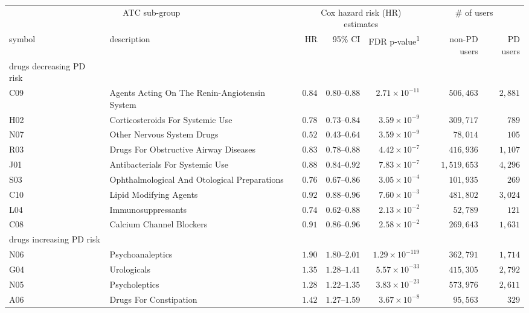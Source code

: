 \captionsetup[table]{labelformat=empty,skip=1pt}
\begin{longtable}{llrrrrr}
\toprule
\multicolumn{2}{c}{ATC sub-group} & \multicolumn{3}{c}{Cox hazard risk (HR) estimates} & \multicolumn{2}{c}{\# of users} \\ 
 \cmidrule(lr){1-2} \cmidrule(lr){3-5} \cmidrule(lr){6-7}
symbol & description & HR & 95\% CI & FDR p-value\textsuperscript{1} & non-PD users & PD users \\ 
\midrule
\multicolumn{1}{l}{drugs decreasing PD risk} \\ 
\midrule
C09 & Agents Acting On The Renin-Angiotensin System & $0.84$ & $0.80$–$0.88$ & $2.71 \times 10^{-11}$ & $506,463$ & $2,881$ \\ 
H02 & Corticosteroids For Systemic Use & $0.78$ & $0.73$–$0.84$ & $3.59 \times 10^{-9}$ & $309,717$ & $789$ \\ 
N07 & Other Nervous System Drugs & $0.52$ & $0.43$–$0.64$ & $3.59 \times 10^{-9}$ & $78,014$ & $105$ \\ 
R03 & Drugs For Obstructive Airway Diseases & $0.83$ & $0.78$–$0.88$ & $4.42 \times 10^{-7}$ & $416,936$ & $1,107$ \\ 
J01 & Antibacterials For Systemic Use & $0.88$ & $0.84$–$0.92$ & $7.83 \times 10^{-7}$ & $1,519,653$ & $4,296$ \\ 
S03 & Ophthalmological And Otological Preparations & $0.76$ & $0.67$–$0.86$ & $3.05 \times 10^{-4}$ & $101,935$ & $269$ \\ 
C10 & Lipid Modifying Agents & $0.92$ & $0.88$–$0.96$ & $7.60 \times 10^{-3}$ & $481,802$ & $3,024$ \\ 
L04 & Immunosuppressants & $0.74$ & $0.62$–$0.88$ & $2.13 \times 10^{-2}$ & $52,789$ & $121$ \\ 
C08 & Calcium Channel Blockers & $0.91$ & $0.86$–$0.96$ & $2.58 \times 10^{-2}$ & $269,643$ & $1,631$ \\ 
\midrule
\multicolumn{1}{l}{drugs increasing PD risk} \\ 
\midrule
N06 & Psychoanaleptics & $1.90$ & $1.80$–$2.01$ & $1.29 \times 10^{-119}$ & $362,791$ & $1,714$ \\ 
G04 & Urologicals & $1.35$ & $1.28$–$1.41$ & $5.57 \times 10^{-33}$ & $415,305$ & $2,792$ \\ 
N05 & Psycholeptics & $1.28$ & $1.22$–$1.35$ & $3.83 \times 10^{-23}$ & $573,976$ & $2,611$ \\ 
A06 & Drugs For Constipation & $1.42$ & $1.27$–$1.59$ & $3.67 \times 10^{-8}$ & $95,563$ & $329$ \\ 

\end{longtable}
